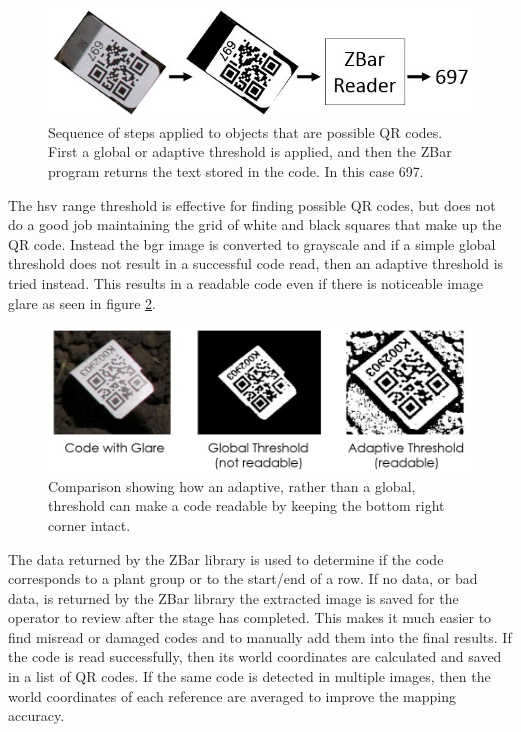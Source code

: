 \begin{figure}
	\centering
    \includegraphics[width=6in]{figures/code_extraction_step2.jpg}
    \caption[Extracted code threshold]{Sequence of steps applied to objects that are possible QR codes.  First a global or adaptive threshold is applied, and then the ZBar program returns the text stored in the code. In this case 697.}
    \label{figure:code_extraction2}
\end{figure} 

The \ac{hsv} range threshold is effective for finding possible QR codes, but does not do a good job maintaining the grid of white and black squares that make up the QR code.  Instead the \ac{bgr} image is converted to grayscale and if a simple global threshold does not result in a successful code read, then an adaptive threshold is tried instead.  This results in a readable code even if there is noticeable image glare as seen in figure \ref{figure:adaptive_threshold}. 

\begin{figure}
	\centering
    \includegraphics[width=5.5in]{figures/adaptive_threshold.jpg}
    \caption[Adaptive threshold]{Comparison showing how an adaptive, rather than a global, threshold can make a code readable by keeping the bottom right corner intact.}
    \label{figure:adaptive_threshold}
\end{figure} 

The data returned by the ZBar library is used to determine if the code corresponds to a plant group or to the start/end of a row.  If no data, or bad data, is returned by the ZBar library the extracted image is saved for the operator to review after the stage has completed.  This makes it much easier to find misread or damaged codes and to manually add them into the final results.  If the code is read successfully, then its world coordinates are calculated and saved in a list of QR codes.   If the same code is detected in multiple images, then the world coordinates of each reference are averaged to improve the mapping accuracy.

